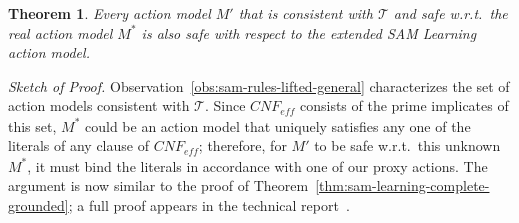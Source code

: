 \documentclass{article}
\newtheorem{theorem}{Theorem}
\newcommand{\tuple}[1]{\ensuremath{\left \langle #1 \right \rangle }}
\newcommand{\eff}{\textit{eff}}
\newcommand{\cnf}{\textit{CNF}}
\newcommand{\realm}{\ensuremath{M^*}\xspace}
\newcommand{\lifta}{A}
\begin{document}
\begin{theorem}\label{e-sam-strong-theorem}
Every action model $M'$ that is consistent with $\mathcal{T}$ 
and safe w.r.t.\ the real action model \realm is also safe with respect to the extended SAM Learning action model.
\end{theorem}
\noindent
\emph{Sketch of Proof.}
Observation~\ref{obs:sam-rules-lifted-general} characterizes
the set of action models consistent with $\mathcal{T}$.
Since $\cnf_\eff$ consists of the prime implicates of this set, $M^*$ could be an action model that uniquely satisfies any one of the literals of any clause of $\cnf_\eff$; therefore, for $M'$ to be safe w.r.t.\ this unknown $M^*$, it must bind the literals in accordance with one of our proxy actions. The argument is now similar to the proof of Theorem~\ref{thm:sam-learning-complete-grounded}; a full proof
appears in the technical report~\cite{juba2021arxiv}.
\end{document}
